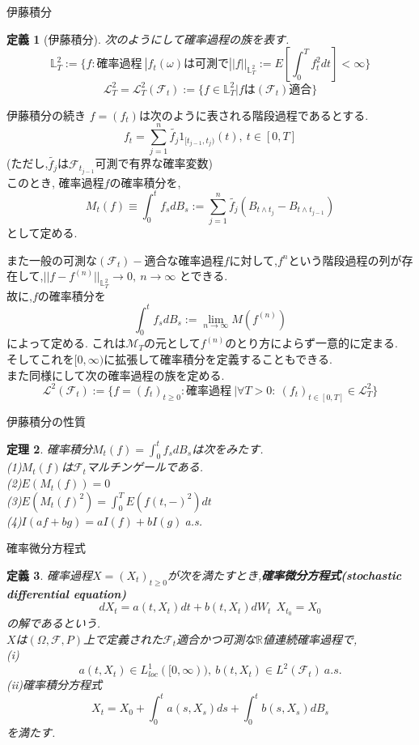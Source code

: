 \documentclass[dvipdfmx,cjk]{beamer}
\numberwithin{equation}{section}
\newtheorem{Thm}     {定理}[section]
\newtheorem{Def}     [Thm]{定義}
\def\R{\mathbb R}
\def\F{\mathcal F}
\def\thm{\begin{Thm}}
\def\thmx{\end{Thm}}
\def\defb{\begin{Def}}
\def\defx{\end{Def}}
\def\eq{\begin{equation}}
\def\eqx{\end{equation}}
\def\bbL{\mathbb L}
\def\calL{\mathcal L}
\begin{document}
\begin{frame}{伊藤積分}
\defb[伊藤積分]
次のようにして確率過程の族を表す.\\
\[
\bbL_T^2 := \{f:\mbox{確率過程}\  | f_t(\omega)\mbox{は可測で}||f||_{\bbL_T^2}:= E[\int_{0}^T f_t^2 dt] < \infty \}
\]
\[
\calL_T^2 = \calL_T^2 (\F_t) := \{ f \in \bbL_T^2 | f\mbox{は}(\F_t)\mbox{適合}\}
\]
\defx
\end{frame}

\begin{frame}{伊藤積分の続き}
$f=(f_t)$は次のように表される階段過程であるとする.\\
\[
f_t = \sum_{j=1}^n \tilde{f_j} 1_{[t_{j-1},t_j)}(t) ,\ t\in [0,T]
\]
(ただし,$\tilde{f_j}$は$\F_{t_{j-1}}$可測で有界な確率変数)\\
このとき, 確率過程$f$の確率積分を,
\[
M_t(f) \equiv \int_0^t f_s dB_s := \sum_{j=1}^n \tilde{f_j} (B_{t\wedge t_j} - B_{t\wedge t_{j-1}})
\]
として定める.
\end{frame}


\begin{frame}
また一般の可測な$(\F_t)-$適合な確率過程$f$に対して,$f^n$という階段過程の列が存在して,$||f-f^{(n)}||_{\bbL_T^2} \to 0 ,\ n\to \infty$
とできる.\\
故に,$f$の確率積分を
\[
\int_0^t f_sdB_s := \lim_{n\to\infty} M(f^{(n)})
\]
によって定める.
これは$\mathcal M _T$の元として$f^{(n)}$のとり方によらず一意的に定まる.\\
そしてこれを$[0,\infty)$に拡張して確率積分を定義することもできる.\\
また同様にして次の確率過程の族を定める.\\
\[
\calL^2(\F_t) := \{f=(f_t)_{t\ge 0}:\mbox{確率過程}\  | \forall T>0 : \ (f_t)_{t\in [0,T]} \in \calL^2_T \}
\]


\end{frame}


\begin{frame}{伊藤積分の性質}
\thm
確率積分$M_t(f) = \int_0^t f_sdB_s$は次をみたす.\\
(1)$M_t(f)$は$\F_t$マルチンゲールである.\\
(2)$E(M_t(f))=0$\\
(3)$E(M_t(f)^2) = \int_0^T E(f(t,-)^2)dt$\\
(4)$I(af+bg) = aI(f)+bI(g)\ $a.s.\\
\thmx
\end{frame}


\begin{frame}{確率微分方程式}
\defb
確率過程$X = (X_t)_{t\ge 0}$が次を満たすとき,{\bf 確率微分方程式(stochastic differential equation)}
\eq
dX_t = a(t,X_t)dt + b(t,X_t)dW_t \ \ X_{t_0} =X_0
\eqx
の解であるという.\\
$X$は$(\Omega,\F,P)$上で定義された$\F_t$適合かつ可測な$\R$値連続確率過程で,\\
(i)
\[
  a(t,X_t) \in L^1_{loc} ([0,\infty)),\  b(t,X_t) \in L^2(\F_t)\  a.s.
\]
(ii)確率積分方程式
\[
X_t = X_0 + \int_0^t a(s,X_s)ds +  \int_0^t b(s,X_s)dB_s
\]
を満たす.
\defx
\end{frame}
\end{document}
